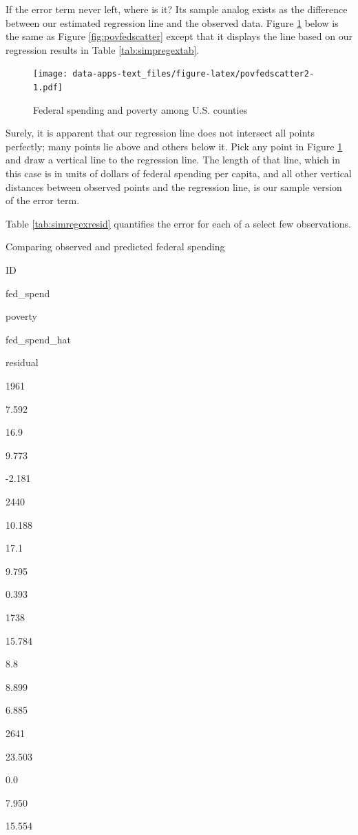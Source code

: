 \documentclass[
]{book}
\begin{document}
If the error term never left, where is it? Its sample analog exists as the difference between our estimated regression line and the observed data. Figure \ref{fig:povfedscatter2} below is the same as Figure \ref{fig:povfedscatter} except that it displays the line based on our regression results in Table \ref{tab:simpregextab}.

\begin{figure}
\centering
\texttt{[image: data-apps-text\_files/figure-latex/povfedscatter2-1.pdf]}
\caption{\label{fig:povfedscatter2}Federal spending and poverty among U.S. counties}
\end{figure}

Surely, it is apparent that our regression line does not intersect all points perfectly; many points lie above and others below it. Pick any point in Figure \ref{fig:povfedscatter2} and draw a vertical line to the regression line. The length of that line, which in this case is in units of dollars of federal spending per capita, and all other vertical distances between observed points and the regression line, is our sample version of the error term.

Table \ref{tab:simregexresid} quantifies the error for each of a select few observations.

\label{tab:simregexresid}Comparing observed and predicted federal spending

ID

fed\_spend

poverty

fed\_spend\_hat

residual

1961

7.592

16.9

9.773

-2.181

2440

10.188

17.1

9.795

0.393

1738

15.784

8.8

8.899

6.885

2641

23.503

0.0

7.950

15.554
\end{document}
